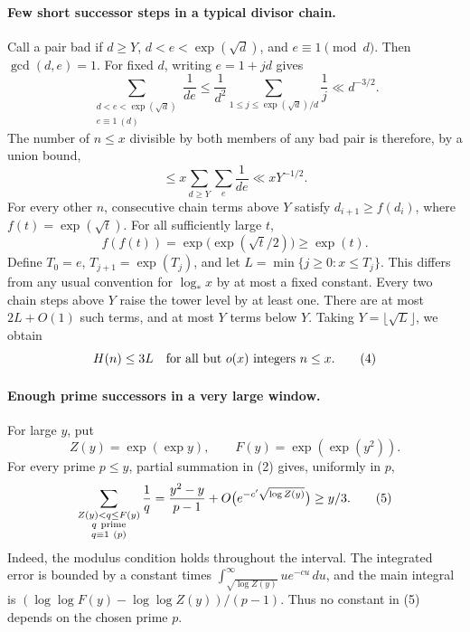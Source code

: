 \paragraph{Few short successor steps in a typical divisor chain.}
Call a pair bad if \(d\geq Y\), \(d<e<\exp(\sqrt d)\), and
\(e\equiv1\pmod d\). Then \(\gcd(d,e)=1\). For fixed \(d\),
writing \(e=1+jd\) gives
\[
 \sum_{\substack{d<e<\exp(\sqrt d)\\e\equiv1\ (d)}}\frac1{de}
 \leq\frac1{d^2}
       \sum_{1\leq j\leq \exp(\sqrt d)/d}\frac1j
 \ll d^{-3/2}.
\]
The number of \(n\leq x\) divisible by both members of any bad
pair is therefore, by a union bound,
\[
 \leq x\sum_{d\geq Y}\sum_e\frac1{de}\ll xY^{-1/2}.             \tag{3}
\]
For every other \(n\), consecutive chain terms above \(Y\)
satisfy \(d_{i+1}\geq f(d_i)\), where \(f(t)=\exp(\sqrt t)\).
For all sufficiently large \(t\),
\[
 f(f(t))=\exp\bigl(\exp(\sqrt t/2)\bigr)\geq\exp(t).
\]
Define \(T_0=e\), \(T_{j+1}=\exp(T_j)\), and let
\(L=\min\{j\geq0:x\leq T_j\}\).
This differs from any usual convention for \(\log_*x\) by
at most a fixed constant. Every two chain steps above \(Y\)
raise the tower level by at least one. There are at most
\(2L+O(1)\) such terms, and at most \(Y\) terms below \(Y\).
Taking \(Y=\lfloor\sqrt L\rfloor\), we obtain
\[
 H(n)\leq3L
 \quad\hbox{for all but }o(x)\hbox{ integers }n\leq x.            \tag{4}
\]

\paragraph{Enough prime successors in a very large window.}
For large \(y\), put
\[
 Z(y)=\exp(\exp y),\qquad F(y)=\exp(\exp(y^2)).
\]
For every prime \(p\leq y\), partial summation in (2) gives,
uniformly in \(p\),
\[
 \sum_{\substack{Z(y)<q\leq F(y)\\q\ {\rm prime}\\q\equiv1\ (p)}}
       \frac1q
 =\frac{y^2-y}{p-1}+O\bigl(e^{-c'\sqrt{\log Z(y)}}\bigr)
 \geq y/3.                                                     \tag{5}
\]
Indeed, the modulus condition holds throughout the interval.
The integrated error is bounded by a constant times
\(\int_{\sqrt{\log Z(y)}}^\infty u e^{-cu}\,du\), and the
main integral is
\((\log\log F(y)-\log\log Z(y))/(p-1)\).
Thus no constant in (5) depends on the chosen prime \(p\).

